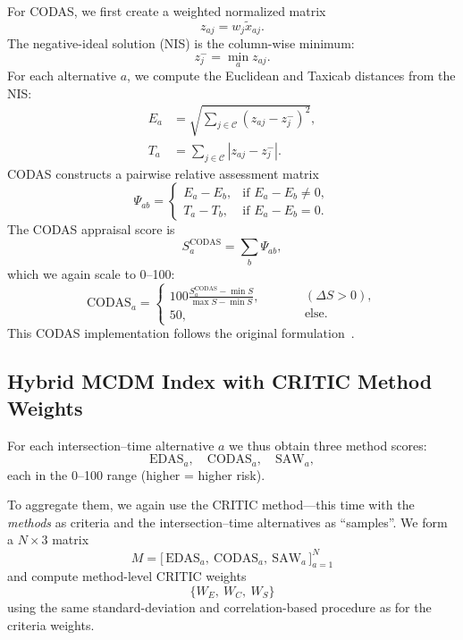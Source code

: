 \documentclass[conference]{IEEEtran}
\begin{document}
For CODAS, we first create a weighted normalized matrix
\begin{equation}
z_{a j} = w_j \tilde x_{a j}.
\end{equation}
The negative-ideal solution (NIS) is the column-wise minimum:
\begin{equation}
z^-_j = \min_a z_{a j}.
\end{equation}
For each alternative $a$, we compute the Euclidean and Taxicab distances from
the NIS:
\begin{align}
E_a &= \sqrt{\sum_{j \in \mathcal{C}} (z_{a j} - z^-_j)^2},\\
T_a &= \sum_{j \in \mathcal{C}} |z_{a j} - z^-_j|.
\end{align}
CODAS constructs a pairwise relative assessment matrix
\begin{equation}
\Psi_{ab} = 
\begin{cases}
E_a - E_b, & \text{if }E_a - E_b \neq 0,\\
T_a - T_b, & \text{if }E_a - E_b = 0.
\end{cases}
\end{equation}
The CODAS appraisal score is
\begin{equation}
S^{\text{CODAS}}_a = \sum_b \Psi_{ab},
\end{equation}
which we again scale to 0--100:
\begin{equation}
\mathrm{CODAS}_a =
\begin{cases}
\displaystyle
100 \frac{
S^{\mathrm{CODAS}}_a - \min S
}{
\max S - \min S
}, \\[0.8em]
50,
\end{cases}
\qquad
\begin{aligned}
&(\Delta S > 0),\\
&\text{else}.
\end{aligned}
\end{equation}
This CODAS implementation follows the original formulation~\cite{CODAS}.

\subsection{Hybrid MCDM Index with CRITIC Method Weights}

For each intersection--time alternative $a$ we thus obtain three method scores:
\[
\mathrm{EDAS}_a,\quad \mathrm{CODAS}_a,\quad \mathrm{SAW}_a,
\]
each in the 0--100 range (higher = higher risk).

To aggregate them, we again use the CRITIC method---this time with the
\emph{methods} as criteria and the intersection--time alternatives as “samples”.
We form a $N \times 3$ matrix
\[
M = 
\big[\,
\mathrm{EDAS}_a,\ \mathrm{CODAS}_a,\ \mathrm{SAW}_a
\,\big]_{a=1}^N
\]
and compute method-level CRITIC weights
\[
\{W_E,\ W_C,\ W_S\}
\]
using the same standard-deviation and correlation-based procedure as for the
criteria weights.
\end{document}
